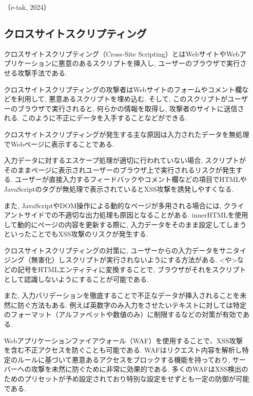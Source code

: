 \documentclass{ltjsarticle} %
\begin{document}
（e-tak, 2024）

\subsection{クロスサイトスクリプティング}
クロスサイトスクリプティング（Cross-Site Scripting）とはWebサイトやWebアプリケーションに悪意のあるスクリプトを挿入し, 
ユーザーのブラウザで実行させる攻撃手法である. 

\vspace*{0.5cm}

クロスサイトスクリプティングの攻撃者はWebサイトのフォームやコメント欄などを利用して, 悪意あるスクリプトを埋め込む. 
そして, このスクリプトがユーザーのブラウザで実行されると, 何らかの情報を取得し, 攻撃者のサイトに送信される. 
このように不正にデータを入手することなどができる. 

\vspace*{0.5cm}

クロスサイトスクリプティングが発生する主な原因は入力されたデータを無処理でWebページに表示することである. 

入力データに対するエスケープ処理が適切に行われていない場合, 
スクリプトがそのままページに表示されユーザーのブラウザ上で実行されるリスクが発生する. 
ユーザーが直接入力するフィードバックやコメント欄などの項目でHTMLや
JavaScriptのタグが無処理で表示されているとXSS攻撃を誘発しやすくなる. 

また, JavaScriptやDOM操作による動的なページが多用される場合には, クライアントサイドでの不適切な出力処理も原因となることがある. 
innerHTMLを使用して動的にページの内容を更新する際に, 入力データをそのまま設定してしまうといったことでもXSS攻撃のリスクが発生する. 

\vspace*{0.5cm}

クロスサイトスクリプティングの対策に, ユーザーからの入力データをサニタイジング（無害化）しスクリプトが実行されないようにする方法がある. 
<や>などの記号をHTMLエンティティに変換することで, ブラウザがそれをスクリプトとして認識しないようにすることが可能である. 

また, 入力バリデーションを徹底することで不正なデータが挿入されることを未然に防ぐ方法もある. 
例えば英数字のみ入力をさせたいテキストに対しては特定のフォーマット（アルファベットや数値のみ）に制限するなどの対策が有効である. 

Webアプリケーションファイアウォール（WAF）を使用することで、XSS攻撃を含む不正アクセスを防ぐことも可能である. 
WAFはリクエスト内容を解析し特定のルールに基づいて悪意あるアクセスをブロックする機能を持っており, 
サーバーへの攻撃を未然に防ぐために非常に効果的である. 
多くのWAFはXSS検出のためのプリセットが予め設定されており特別な設定をせずとも一定の防御が可能である. 
\end{document}
